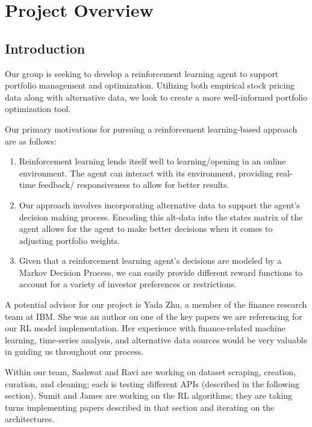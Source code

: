 \chapter{Project Overview}

\section{Introduction}

Our group is seeking to develop a reinforcement learning agent to support portfolio 
management and optimization. Utilizing both empirical stock pricing data along with 
alternative data, we look to create a more well-informed portfolio optimization tool. 

Our primary motivations for pursuing a reinforcement learning-based approach are as 
follows:

\begin{enumerate}
    \item Reinforcement learning lends itself well to learning/opening in an online environment. The agent can interact with its environment, providing real-time feedback/ responsiveness to allow for better results.
    \item Our approach involves incorporating alternative data to support the agent’s decision making process. Encoding this alt-data into the states matrix of the agent allows for the agent to make better decisions when it comes to adjusting portfolio weights.
    \item Given that a reinforcement learning agent’s decisions are modeled by a Markov Decision Process, we can easily provide different reward functions to account for a variety of investor preferences or restrictions.
\end{enumerate}

A potential advisor for our project is Yada Zhu, a member of the finance research team 
at IBM. She was an author on one of the key papers we are referencing for our RL model 
implementation. Her experience with finance-related machine learning, time-series 
analysis, and alternative data sources would be very valuable in guiding us throughout 
our process.

Within our team, Sashwat and Ravi are working on dataset scraping, creation, curation, 
and cleaning; each is testing different APIs (described in the following section). 
Sumit and James are working on the RL algorithms; they are taking turns implementing 
papers described in that section and iterating on the architectures.




